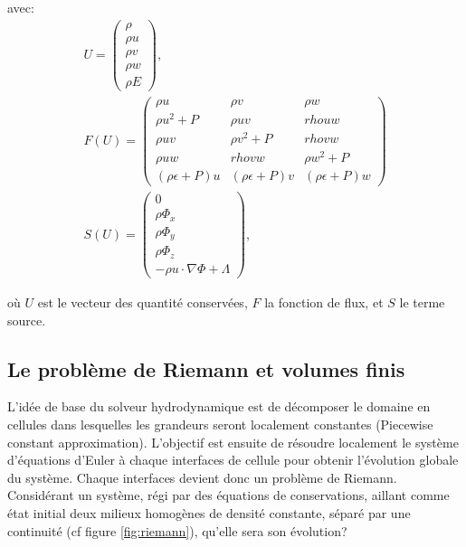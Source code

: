 avec:
\begin{equation}
\begin{array}{c}

U=
\left(
\begin{array}{c}
{ \rho}\\
{\rho u}\\
{\rho v}\\
{\rho w}\\
{\rho E}
\end{array}
\right),
\\
F(U)=
\left(
\begin{array}{ccc}
\rho u & \rho v & \rho w \\ 
\rho u^2 +P & \rho uv & rho uw \\ 
\rho uv & \rho v^2 +P & rho vw \\ 
\rho uw & rho vw &\rho w^2 +P \\ 
(\rho \epsilon + P)u & (\rho \epsilon + P)v & (\rho \epsilon + P)w
\end{array} 
\right)
\\
S(U) =
\left(
\begin{array}{c}
{ 0}\\
{\rho \Phi_x}\\
{\rho \Phi_y}\\
{\rho \Phi_z}\\
{- \rho u \cdot \nabla \Phi + \Lambda }
\end{array}
\right),
\end{array} 
\end{equation}

où $U$ est le vecteur des quantité conservées, $F$ la fonction de flux, et $S$ le terme source.

\subsection{Le problème de Riemann et volumes finis}

L'idée de base du solveur hydrodynamique est de décomposer le domaine en cellules dans lesquelles les grandeurs seront localement constantes (Piecewise constant approximation).
L'objectif est ensuite de résoudre localement le système d'équations d'Euler à chaque interfaces de cellule pour obtenir l'évolution globale du système.
Chaque interfaces devient donc un problème de Riemann.
Considérant un système, régi par des équations de conservations, aillant comme état initial deux milieux homogènes de densité constante, séparé par une continuité (cf figure \ref{fig:riemann}), qu'elle sera son évolution?

